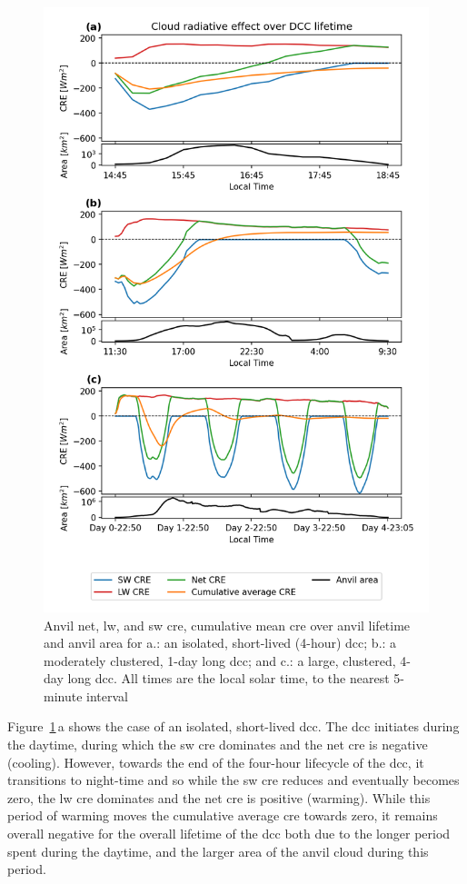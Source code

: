 \documentclass[acp, manuscript]{copernicus}
\begin{document}
\begin{figure}[tp]
    \centering
    \includegraphics[width=12cm]{figures/fig10.png}
    \caption[
    Anvil net, \acrshort{lw}, and \acrshort{sw} \acrshort{cre}, cumulative mean \acrshort{cre} over anvil lifetime
    ]{
    Anvil net, \acrshort{lw}, and \acrshort{sw} \acrshort{cre}, cumulative mean \acrshort{cre} over anvil lifetime and anvil area for a.: an isolated, short-lived (4-hour) \acrshort{dcc}; b.: a moderately clustered, 1-day long \acrshort{dcc}; and c.: a large, clustered, 4-day long \acrshort{dcc}. All times are the local solar time, to the nearest 5-minute interval
    }
    \label{fig:cre_lifecycle_examples}
\end{figure}


Figure~\ref{fig:cre_lifecycle_examples}\,a shows the case of an isolated, short-lived \acrshort{dcc}. 
The \acrshort{dcc} initiates during the daytime, during which the \acrshort{sw} \acrshort{cre} dominates and the net \acrshort{cre} is negative (cooling). 
However, towards the end of the four-hour lifecycle of the \acrshort{dcc}, it transitions to night-time and so while the \acrshort{sw} \acrshort{cre} reduces and eventually becomes zero, the \acrshort{lw} \acrshort{cre} dominates and the net \acrshort{cre} is positive (warming). 
While this period of warming moves the cumulative average \acrshort{cre} towards zero, it remains overall negative for the overall lifetime of the \acrshort{dcc} both due to the longer period spent during the daytime, and the larger area of the anvil cloud during this period.
\end{document}
